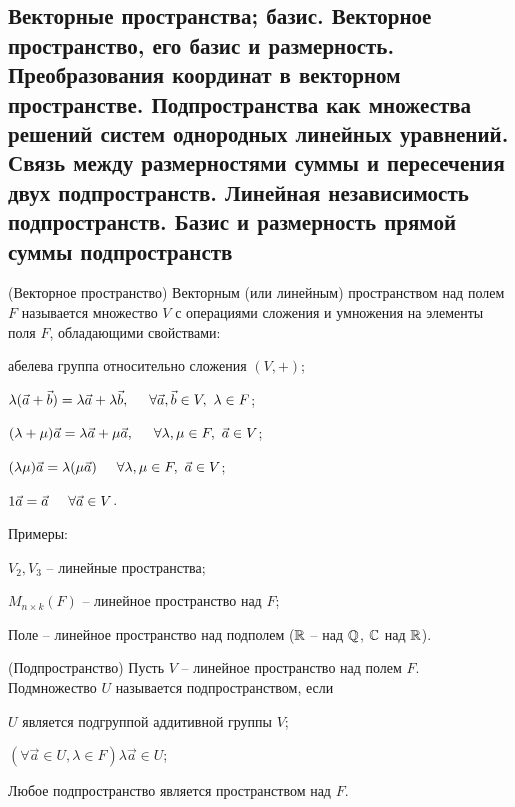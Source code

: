 \begin{multicols}{2}
\section{Векторные пространства; базис. Векторное пространство, его базис и размерность.
Преобразования координат в векторном пространстве. Подпространства как множества
решений систем однородных линейных уравнений. Связь между размерностями суммы
и пересечения двух подпространств. Линейная независимость подпространств. Базис и
размерность прямой суммы подпространств}
\begin{definition}{(Векторное пространство)}{}
    Векторным (или линейным) пространством над полем $F$ называется множество $V$ с операциями сложения и умножения на элементы поля $F$, обладающими свойствами:
    \begin{enumerate*}
        \item абелева группа относительно сложения $(V, +)$;
        \item $\lambda(\vec{a}+\vec{b}) = \lambda \vec{a} + \lambda \vec{b}, \hspace*{0.5cm} \forall \vec{a},\vec{b}\in V, \ \lambda \in F$;
        \item $(\lambda + \mu)\vec{a} = \lambda \vec{a} + \mu \vec{a}, \hspace*{0.5cm} \forall \lambda, \mu \in F, \ \vec{a}\in V$;
        \item $(\lambda \mu)\vec{a} = \lambda (\mu \vec{a}) \hspace*{0.5cm} \forall \lambda, \mu \in F, \ \vec{a} \in V$;
        \item $1\vec{a} =\vec{a} \hspace*{0.5cm} \forall \vec{a} \in V$. 
    \end{enumerate*}
\end{definition}
Примеры:
\begin{multicols}{2}
\begin{enumerate*}
    \item $V_2, V_3$ -- линейные пространства;
    \item $M_{n\times k} (F)$ -- линейное пространство над $F$;
    \item Поле -- линейное пространство над подполем ($\mathbb{R}$ -- над $\mathbb{Q}$, $\mathbb{C}$ над $\mathbb{R}$).
\end{enumerate*}
\end{multicols}
\begin{definition}{(Подпространство)}{}
    Пусть $V$ -- линейное пространство над полем $F$. Подмножество $U$ называется подпространством, если
    \begin{enumerate*}
        \item $U$ является подгруппой аддитивной группы $V$;
        \item $(\forall \vec{a} \in U, \lambda \in F) \lambda \vec{a} \in U$;
    \end{enumerate*}
\end{definition}
\par
Любое подпространство является пространством над $F$.
\vspace*{0.5cm}


\end{multicols}
